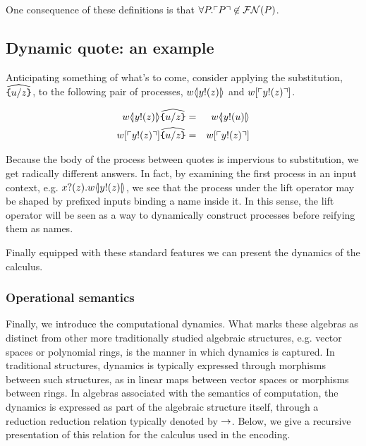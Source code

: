 \begin{remark}\label{rem:no_self_referential_names}
  One consequence of these definitions is that $\forall P. \ulcorner P \urcorner
  \not\in \mathbin{\mathcal{FN}(P)}$.
\end{remark}

\subsection{ Dynamic quote: an example }

Anticipating something of what's to come, consider applying the
substitution, $\widehat{\texttt{\{}u / z \texttt{\}}}$, to the following pair
of processes, $w \langle\!| y!(z) |\!\rangle$ and $w[ \ulcorner y!(z) \urcorner ]$.

\begin{eqnarray}
	w \langle\!| y!(z) |\!\rangle\widehat{\texttt{\{}u / z \texttt{\}}}
		& = &
		w \langle\!| y!(u) |\!\rangle \nonumber\\
	w[ \ulcorner y!(z) \urcorner ] \widehat{ \texttt{\{}u / z \texttt{\}} }
		& = &
		w[ \ulcorner y!(z) \urcorner ] \nonumber
\end{eqnarray}

Because the body of the process between quotes is impervious to
substitution, we get radically different answers. In fact, by
examining the first process in an input context,
e.g. $x?(z).w \langle\!| y!(z) |\!\rangle$, we see that the process under the lift
operator may be shaped by prefixed inputs binding a name inside it. In
this sense, the lift operator will be seen as a way to dynamically
construct processes before reifying them as names.

Finally equipped with these standard features we can present the
dynamics of the calculus.

\subsubsection{Operational semantics} 

Finally, we introduce the computational dynamics. What marks these
algebras as distinct from other more traditionally studied algebraic
structures, e.g. vector spaces or polynomial rings, is the manner in
which dynamics is captured. In traditional structures, dynamics is typically
expressed through morphisms between such structures, as in linear maps
between vector spaces or morphisms between rings. In algebras
associated with the semantics of computation, the dynamics is
expressed as part of the algebraic structure itself, through a
reduction reduction relation typically denoted by $\rightarrow$. Below, we
give a recursive presentation of this relation for the calculus used
in the encoding.

